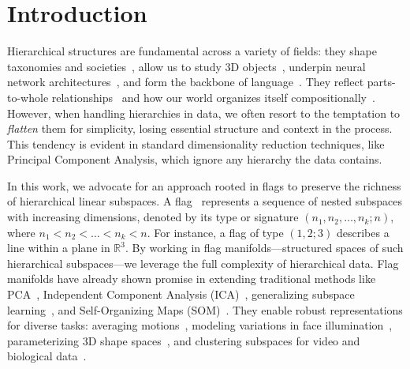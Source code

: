 \section{Introduction}\label{sec:intro}
Hierarchical structures are fundamental across a variety of fields: they shape taxonomies and societies~\cite{lane2006hierarchy}, allow us to study 3D objects~\cite{leng2024hypersdfusion}, underpin neural network architectures~\cite{yan2015hd}, and form the backbone of language~\cite{longacre1966hierarchy}. They reflect parts-to-whole relationships~\cite{taher2024representing} and how our world organizes itself compositionally~\cite{salthe1985evolving}.
However, when handling hierarchies in data, we often resort to the temptation to \textit{flatten} them for simplicity, losing essential structure and context in the process. This tendency is evident in standard dimensionality reduction techniques, like Principal Component Analysis, which ignore any hierarchy the data contains.

In this work, we advocate for an approach rooted in flags to preserve the richness of hierarchical linear subspaces. A flag~\cite{Mankovich_2023_ICCV,mankovich2024fun} represents a sequence of nested subspaces with increasing dimensions, denoted by its type or signature $(n_1,n_2,\dots,n_k;n)$, where $n_1$$<$$n_2$$<$$\dots$$<$$n_k$$<$$n$. For instance, a flag of type $(1,2;3)$ describes a line within a plane in $\mathbb{R}^3$. By working in flag manifolds—structured spaces of such hierarchical subspaces—we leverage the full complexity of hierarchical data. Flag manifolds have already shown promise in extending traditional methods like PCA~\cite{pennec2018barycentric, mankovich2024fun, szwagier2024curseisotropyprincipalcomponents}, Independent Component Analysis (ICA)~\cite{nishimori2006riemannian,nishimori2006riemannian0,nishimori2006riemannian1,nishimori2007flag,nishimori2008natural}, generalizing subspace learning~\cite{szwagier2025nestedsubspacelearningflags}, and Self-Organizing Maps (SOM)~\cite{ma2022self}. They enable robust representations for diverse tasks: averaging motions~\cite{Mankovich_2023_ICCV}, modeling variations in face illumination~\cite{draper2014flag, Mankovich_2023_ICCV}, parameterizing 3D shape spaces~\cite{ciuclea2023shape}, and clustering subspaces for video and biological data~\cite{marrinan2014finding, mankovich2022flag, Mankovich_2023_ICCV, mankovich2023module}.

